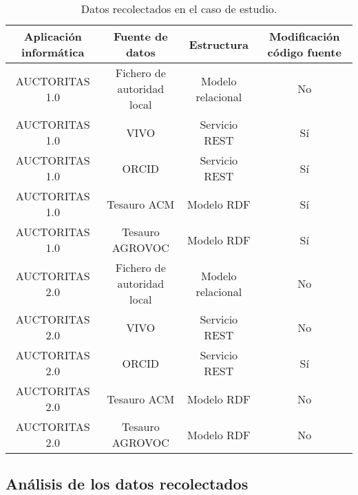 \begin{table}
\centering
\begin{tabular}{c|c|c|c}
\hline 
Aplicación informática & Fuente de datos & Estructura & Modificación código fuente \\ 
\hline 
AUCTORITAS 1.0 & Fichero de autoridad local & Modelo relacional & No\\
\hline
AUCTORITAS 1.0 & VIVO & Servicio REST & Sí\\
\hline
AUCTORITAS 1.0 & ORCID & Servicio REST & Sí\\
\hline
AUCTORITAS 1.0 & Tesauro ACM & Modelo RDF & Sí\\
\hline
AUCTORITAS 1.0 & Tesauro AGROVOC & Modelo RDF & Sí\\
\hline
AUCTORITAS 2.0 & Fichero de autoridad local & Modelo relacional & No\\
\hline
AUCTORITAS 2.0 & VIVO & Servicio REST & No\\
\hline
AUCTORITAS 2.0 & ORCID & Servicio REST & Sí\\
\hline
AUCTORITAS 2.0 & Tesauro ACM & Modelo RDF & No\\
\hline
AUCTORITAS 2.0 & Tesauro AGROVOC & Modelo RDF & No\\
\hline
\end{tabular} 
\caption{Datos recolectados en el caso de estudio.}
\label{tabla: recoleccion}
\end{table}

\subsection{Análisis de los datos recolectados}
